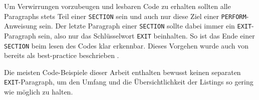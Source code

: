 Um Verwirrungen vorzubeugen und lesbaren Code zu erhalten sollten alle Paragraphs stets Teil einer \texttt{SECTION} sein und auch nur diese Ziel einer \texttt{PERFORM}-Anweisung sein. Der letzte Paragraph einer \texttt{SECTION} sollte dabei immer ein \texttt{EXIT}-Paragraph sein, also nur das Schlüsselwort \texttt{EXIT} beinhalten. So ist das Ende einer \texttt{SECTION} beim lesen des Codes klar erkennbar. Dieses Vorgehen wurde auch von \citeauthor{richards_enhancing_1984} bereits \citeyear{richards_enhancing_1984} als best-practice beschrieben  \cite{richards_enhancing_1984}.

Die meisten Code-Beispiele dieser Arbeit enthalten bewusst keinen separaten \texttt{EXIT}-Paragraph, um den Umfang und die Übersichtlichkeit der Listings so gering wie möglich zu halten. 